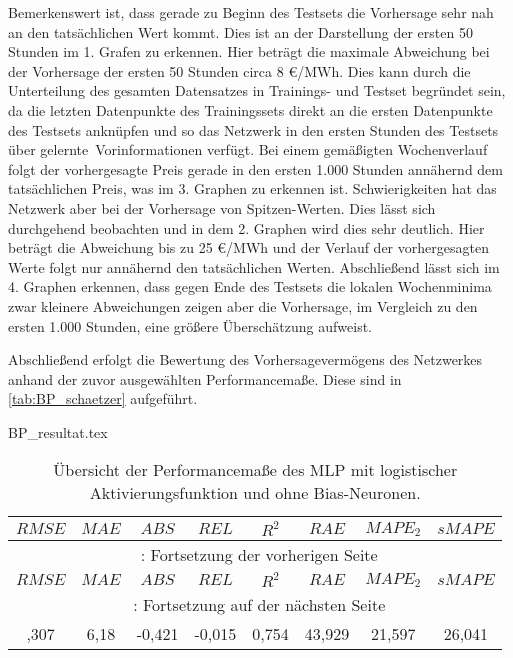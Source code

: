 Bemerkenswert ist, dass gerade zu Beginn des Testsets die Vorhersage sehr nah an den tatsächlichen Wert kommt. Dies ist an der Darstellung der ersten 50 Stunden im 1. Grafen zu erkennen. Hier beträgt die maximale Abweichung bei der Vorhersage der ersten 50 Stunden circa 8 €/MWh. Dies kann durch die Unterteilung des gesamten Datensatzes in Trainings- und Testset begründet sein, da die letzten Datenpunkte des Trainingssets direkt an die ersten Datenpunkte des Testsets anknüpfen und so das Netzwerk in den ersten Stunden des Testsets über \glqq gelernte\grqq~Vorinformationen verfügt.
Bei einem gemäßigten Wochenverlauf folgt der vorhergesagte Preis gerade in den ersten 1.000 Stunden annähernd dem tatsächlichen Preis, was im 3. Graphen zu erkennen ist. Schwierigkeiten hat das Netzwerk aber bei der Vorhersage von Spitzen-Werten. Dies lässt sich durchgehend beobachten und in dem 2. Graphen wird dies sehr deutlich. Hier beträgt die Abweichung bis zu 25 €/MWh und der Verlauf der vorhergesagten Werte folgt nur annähernd den tatsächlichen Werten. Abschließend lässt sich im 4. Graphen erkennen, dass gegen Ende des Testsets die lokalen Wochenminima zwar kleinere Abweichungen zeigen aber die Vorhersage, im Vergleich zu den ersten 1.000 Stunden, eine größere Überschätzung aufweist.

Abschließend erfolgt die Bewertung des Vorhersagevermögens des Netzwerkes anhand der zuvor ausgewählten Performancemaße. Diese sind in \autoref{tab:BP_schaetzer} aufgeführt.


\begin{filecontents*}{BP_resultat.tex}
{
\captionsetup{skip=1pt,margin=5pt,position=below} %

\begin{longtable}{cccccccc}
    \caption[Übersicht der Performancemaße des genauesten Netzwerkes beim BP-Verf.]{Übersicht der Performancemaße des MLP mit logistischer Aktivierungsfunktion und ohne Bias-Neuronen.} \label{tab:BP_schaetzer}\\
    \toprule
    \hiderowcolors
        $RMSE$ & $MAE$ & $ABS$ & $REL$ & $R^2$ & $RAE$ & $MAPE_2$ & $sMAPE$ \\
    \midrule
    \endfirsthead
        \multicolumn{8}{c}{\footnotesize \tablename\ \thetable{}: Fortsetzung der vorherigen Seite} \\
    \toprule
        $RMSE$ & $MAE$ & $ABS$ & $REL$ & $R^2$ & $RAE$ & $MAPE_2$ & $sMAPE$ \\
    \midrule
    \endhead
    \midrule
        \multicolumn{8}{c}{{\footnotesize \tablename\ \thetable{}: Fortsetzung auf der nächsten Seite}} \\
    \bottomrule
    \endfoot
    \bottomrule
    \endlastfoot
    \showrowcolors
        8,307 & 6,18 & -0,421 & -0,015 & 0,754 & 43,929 & 21,597 & 26,041 \\
\end{longtable}

}
\end{filecontents*}

